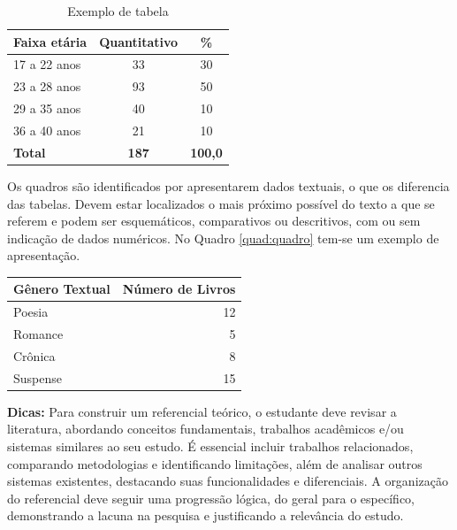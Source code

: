 \documentclass[
	article,			%
	12pt,				%
	oneside,			%
	a4paper,			%
	english,			%
	brazil,				%
	sumario=tradicional
]{abntex2}
\begin{document}
\begin{table}[h]
    \centering
    \caption{Exemplo de tabela}
    \label{tab:tabela}
    \setlength{\tabcolsep}{16pt}
    \begin{tabular}{l c c}
        \toprule
        \textbf{Faixa etária} & \textbf{Quantitativo} & \textbf{\%} \\
        \midrule
        17 a 22 anos & 33  & 30   \\
        23 a 28 anos & 93  & 50   \\
        29 a 35 anos & 40  & 10   \\
        36 a 40 anos & 21  & 10   \\
        \midrule
        \textbf{Total} & \textbf{187} & \textbf{100,0} \\
        \bottomrule
    \end{tabular}
\end{table}

Os quadros são identificados por apresentarem dados textuais, o que os
diferencia das tabelas. Devem estar localizados o mais próximo possível do texto
a que se referem e podem ser esquemáticos, comparativos ou descritivos, com ou
sem indicação de dados numéricos. No Quadro \ref{quad:quadro} tem-se um exemplo
de apresentação.

\begin{square}
    \label{quad:quadro}
    \centering
    \renewcommand{\arraystretch}{1.2}
    \setlength{\tabcolsep}{10pt}
    \begin{tabular}{|l|r|}
        \hline
        \textbf{Gênero Textual} & \textbf{Número de Livros} \\
        \hline
        Poesia   & 12 \\
        \hline
        Romance  & 5  \\
        \hline
        Crônica  & 8  \\
        \hline
        Suspense & 15 \\
        \hline
    \end{tabular}
\end{square}

\textbf{Dicas:} Para construir um referencial teórico, o estudante deve
revisar a literatura, abordando conceitos fundamentais, trabalhos acadêmicos
e/ou sistemas similares ao seu estudo. É essencial incluir trabalhos
relacionados, comparando metodologias e identificando limitações, além de
analisar outros sistemas existentes, destacando suas funcionalidades e
diferenciais. A organização do referencial deve seguir uma progressão
lógica, do geral para o específico, demonstrando a lacuna na pesquisa e
justificando a relevância do estudo.
\end{document}
